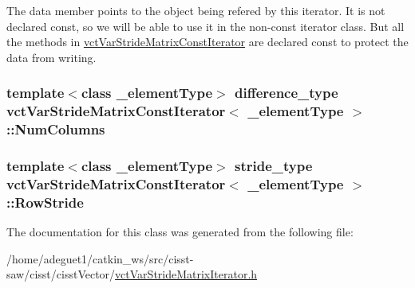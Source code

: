The data member points to the object being refered by this iterator. It is not declared const, so we will be able to use it in the non-\/const iterator class. But all the methods in \hyperlink{classvct_var_stride_matrix_const_iterator}{vct\-Var\-Stride\-Matrix\-Const\-Iterator} are declared const to protect the data from writing. \hypertarget{classvct_var_stride_matrix_const_iterator_acbbccea49ba03c2c413bffe4bb5bfa7f}{
\subsubsection[{Num\-Columns}]{\setlength{\rightskip}{0pt plus 5cm}template$<$class \-\_\-element\-Type$>$ difference\-\_\-type {\bf vct\-Var\-Stride\-Matrix\-Const\-Iterator}$<$ \-\_\-element\-Type $>$\-::Num\-Columns\hspace{0.3cm}{\ttfamily [protected]}}}\label{classvct_var_stride_matrix_const_iterator_acbbccea49ba03c2c413bffe4bb5bfa7f}
\hypertarget{classvct_var_stride_matrix_const_iterator_a404ec3349c14282af252a00d3b9a6290}{
\subsubsection[{Row\-Stride}]{\setlength{\rightskip}{0pt plus 5cm}template$<$class \-\_\-element\-Type$>$ stride\-\_\-type {\bf vct\-Var\-Stride\-Matrix\-Const\-Iterator}$<$ \-\_\-element\-Type $>$\-::Row\-Stride\hspace{0.3cm}{\ttfamily [protected]}}}\label{classvct_var_stride_matrix_const_iterator_a404ec3349c14282af252a00d3b9a6290}


The documentation for this class was generated from the following file\-:\begin{DoxyCompactItemize}
\item 
/home/adeguet1/catkin\-\_\-ws/src/cisst-\/saw/cisst/cisst\-Vector/\hyperlink{vct_var_stride_matrix_iterator_8h}{vct\-Var\-Stride\-Matrix\-Iterator.\-h}\end{DoxyCompactItemize}
